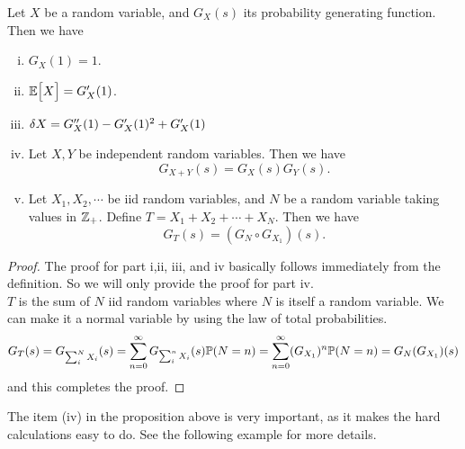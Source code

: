 \begin{proposition}
	Let $ X $ be a random variable, and $ G_X(s) $ its probability generating function. Then we have
	\begin{enumerate}[(i)]
		\item $ G_X(1) = 1 $.
		\item $ \mathbb{E}\big[X\big] = G_X'(1)  $.
		\item $ \var{X} = G_X''(1) - G_X'(1)^2 + G_X'(1) $
		\item Let $X, Y$ be independent random variables. Then we have
		\[  G_{X+Y}(s) = G_X(s) G_Y(s). \]
		\item Let $ X_1, X_2, \cdots $ be iid random variables, and $ N $ be a random variable taking values in $ \mathbb{Z}_+ $. Define $ T = X_1 + X_2 + \cdots + X_N $. Then we have
		\[ G_T(s) = (G_N \circ G_{X_1})(s). \]
	\end{enumerate}
\end{proposition}

\begin{proof}
	The proof for part i,ii, iii, and iv basically follows immediately from the definition. So we will only provide the proof for part iv.\\
	$ T $ is the sum of $ N $ iid random variables where $ N $ is itself a random variable. We can make it a normal variable by using the law of total probabilities.
	\[ G_T(s) = G_{\sum_i^N X_i}(s) = \sum_{n=0}^{\infty}  G_{\sum_i^n X_i}(s) \mathbb{P}(N = n)  = \sum_{n=0}^{\infty}(G_{X_1})^n\mathbb{P}(N=n) = G_N(G_{X_1})(s) \]
	and this completes the proof.
\end{proof}

The item (iv) in the proposition above is very important, as it makes the hard calculations easy to do. See the following example for more details.

